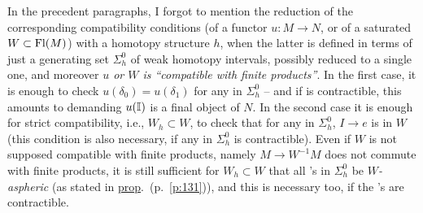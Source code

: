In the precedent paragraphs, I forgot to mention the reduction of the
corresponding compatibility conditions (of a functor $u:M\to N$, or of
a saturated $W\subset\operatorname{Fl}(M)$) with a homotopy structure $h$, when the
latter is defined in terms of just a generating set $\Sigma_h^0$ of
weak homotopy intervals, possibly reduced to a single one, and
moreover \emph{$u$ or $W$ is ``compatible with finite products''}. In
the first case, it is enough to check $u(\delta_0)=u(\delta_1)$ for
any \bI{} in $\Sigma_h^0$ -- and if \bI{} is contractible, this
amounts to demanding $u({\mathbb{I}})$ is a final object of $N$. In the second
case it is enough for strict compatibility, i.e., $W_h\subset W$, to
check that for any \bI{} in $\Sigma_h^0$, $I\to e$ is in $W$ (this
condition is also necessary, if any \bI{} in $\Sigma_h^0$ is
contractible). Even if $W$ is not supposed compatible with finite
products, namely $M\to W^{-1}M$ does not commute with finite products,
it is still sufficient for $W_h\subset W$ that all \bI's in
$\Sigma_h^0$ be \emph{$W$-aspheric} (as stated in
\hyperref[prop:54]{prop}.\ (p.\ \ref{p:131})), and this is necessary
too, if the \bI's are contractible.

\bigbreak

\presectionfill{}\par

